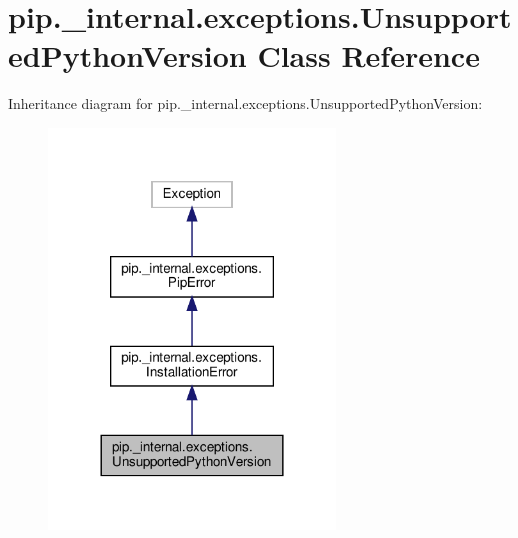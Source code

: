 \hypertarget{classpip_1_1__internal_1_1exceptions_1_1UnsupportedPythonVersion}{}\section{pip.\+\_\+internal.\+exceptions.\+Unsupported\+Python\+Version Class Reference}
\label{classpip_1_1__internal_1_1exceptions_1_1UnsupportedPythonVersion}


Inheritance diagram for pip.\+\_\+internal.\+exceptions.\+Unsupported\+Python\+Version\+:
\nopagebreak
\begin{figure}[H]
\begin{center}
\leavevmode
\includegraphics[width=216pt]{classpip_1_1__internal_1_1exceptions_1_1UnsupportedPythonVersion__inherit__graph}
\end{center}
\end{figure}


